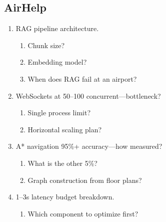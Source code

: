 \documentclass[9pt,a4paper]{article}
\begin{document}
\subsection{AirHelp}
\begin{enumerate}[label=\textbf{Q\arabic*:}, leftmargin=*]
  \item RAG pipeline architecture.
  \begin{enumerate}[label=\textit{FU\arabic*:}, leftmargin=2em]
    \item Chunk size?
    \item Embedding model?
    \item When does RAG fail at an airport?
  \end{enumerate}
  \item WebSockets at 50--100 concurrent---bottleneck?
  \begin{enumerate}[label=\textit{FU\arabic*:}, leftmargin=2em]
    \item Single process limit?
    \item Horizontal scaling plan?
  \end{enumerate}
  \item A* navigation 95\%+ accuracy---how measured?
  \begin{enumerate}[label=\textit{FU\arabic*:}, leftmargin=2em]
    \item What is the other 5\%?
    \item Graph construction from floor plans?
  \end{enumerate}
  \item 1--3s latency budget breakdown.
  \begin{enumerate}[label=\textit{FU\arabic*:}, leftmargin=2em]
    \item Which component to optimize first?
  \end{enumerate}
\end{enumerate}
\end{document}
